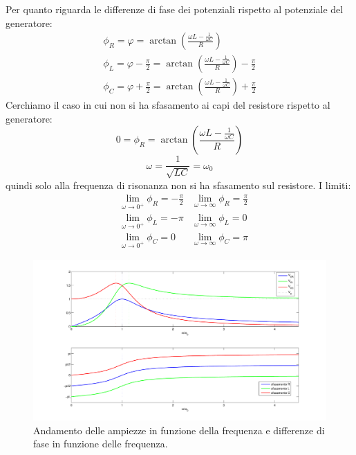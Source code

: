 Per quanto riguarda le differenze di fase dei potenziali rispetto al potenziale del generatore:
\begin{subequations}
  \begin{gather}
    \phi_R=\varphi=\arctan\left(\frac{\omega L-\frac{1}{\omega C}}{R}\right)\\
    \phi_L=\varphi-\frac{\pi}{2}=\arctan\left(\frac{\omega L-\frac{1}{\omega C}}{R}\right)-\frac{\pi}{2}\\
    \phi_C=\varphi+\frac{\pi}{2}=\arctan\left(\frac{\omega L-\frac{1}{\omega C}}{R}\right)+\frac{\pi}{2}
  \end{gather}
\end{subequations}
Cerchiamo il caso in cui non si ha sfasamento ai capi del resistore rispetto al generatore:
\[
  0=\phi_R=\arctan\left(\frac{\omega L-\frac{1}{\omega C}}{R}\right)
\]
\begin{equation}
  \omega=\frac{1}{\sqrt{LC}}=\omega_0
\end{equation}
quindi solo alla frequenza di risonanza non si ha sfasamento sul resistore. I limiti:
\begin{subequations}
  \begin{align}
     & \lim_{\omega\to 0^+}\phi_R=-\frac{\pi}{2} & \lim_{\omega\to\infty}\phi_R=\frac{\pi}{2} \\
     & \lim_{\omega\to 0^+}\phi_L=-\pi           & \lim_{\omega\to\infty}\phi_L=0             \\
     & \lim_{\omega\to 0^+}\phi_C=0              & \lim_{\omega\to\infty}\phi_C=\pi
  \end{align}
\end{subequations}
\begin{figure}[htbp]
  \centering
  \includegraphics[scale=0.45]{immagini/fisica2/RLC_01}
  \caption{Andamento delle ampiezze in funzione della frequenza e differenze di fase in funzione delle frequenza.}
\end{figure}
